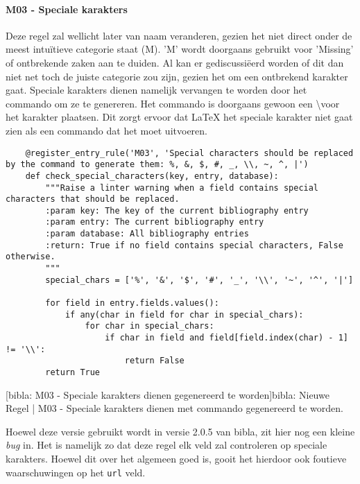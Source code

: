 \paragraph{M03 - Speciale karakters}

Deze regel zal wellicht later van naam veranderen, gezien het niet direct onder de meest intuïtieve categorie staat (M). 'M' wordt doorgaans gebruikt voor 'Missing' of ontbrekende zaken aan te duiden. Al kan er gediscussiëerd worden of dit dan niet net toch de juiste categorie zou zijn, gezien het om een ontbrekend karakter gaat. Speciale karakters dienen namelijk vervangen te worden door het commando om ze te genereren. Het commando is doorgaans gewoon een \backslash voor het karakter plaatsen. Dit zorgt ervoor dat LaTeX het speciale karakter niet gaat zien als een commando dat het moet uitvoeren. 


\begin{verbatim}
    @register_entry_rule('M03', 'Special characters should be replaced by the command to generate them: %, &, $, #, _, \\, ~, ^, |')
    def check_special_characters(key, entry, database):
        """Raise a linter warning when a field contains special characters that should be replaced.
        :param key: The key of the current bibliography entry
        :param entry: The current bibliography entry
        :param database: All bibliography entries
        :return: True if no field contains special characters, False otherwise.
        """
        special_chars = ['%', '&', '$', '#', '_', '\\', '~', '^', '|']
    
        for field in entry.fields.values():
            if any(char in field for char in special_chars):
                for char in special_chars:
                    if char in field and field[field.index(char) - 1] != '\\':
                        return False
        return True
\end{verbatim}
[bibla: M03 - Speciale karakters dienen gegenereerd te worden]{bibla: Nieuwe Regel | M03 - Speciale karakters dienen met commando gegenereerd te worden. \label{lst:bibla_NR_M03}}

Hoewel deze versie gebruikt wordt in versie 2.0.5 van bibla, zit hier nog een kleine \emph{bug} in. Het is namelijk zo dat deze regel elk veld zal controleren op speciale karakters. Hoewel dit over het algemeen goed is, gooit het hierdoor ook foutieve waarschuwingen op het \texttt{url} veld.



